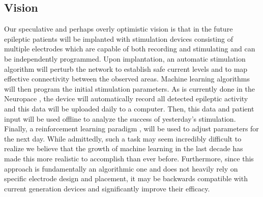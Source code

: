 \documentclass[journal,twoside,web]{ieeecolor}
\begin{document}
\subsection{Vision}

Our speculative and perhaps overly optimistic vision is that in the future epileptic patients will be implanted with stimulation devices consisting of multiple electrodes which are capable of both recording and stimulating \cite{ryapolova14} and can be independently programmed.
Upon implantation, an automatic stimulation algorithm will perturb the network to establish safe current levels and to map effective connectivity between the observed areas.
Machine learning algorithms will then program the initial stimulation parameters.
As is currently done in the Neuropace \cite{NP}, the device will automatically record all detected epileptic activity and this data will be uploaded daily to a computer.
Then, this data and patient input will be used offline to analyze the success of yesterday's stimulation.
Finally, a reinforcement learning paradigm \cite{gosavi14}, will be used to adjust parameters for the next day.
While admittedly, such a task may seem incredibly difficult to realize we believe that the growth of machine learning in the last decade has made this more realistic to accomplish than ever before.
Furthermore, since this approach is fundamentally an algorithmic one and does not heavily rely on specific electrode design and placement, it may be backwards compatible with current generation devices and significantly improve their efficacy.  



  

\end{document}
